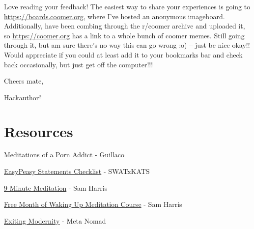 \documentclass[
]{book}
\begin{document}
Love reading your feedback! The easiest way to share your experiences is going to \url{https://boards.coomer.org}, where I've hosted an anonymous imageboard. Additionally, have been combing through the r/coomer archive and uploaded it, so \url{https://coomer.org} has a link to a whole bunch of coomer memes. Still going through it, but am sure there's no way this can go wrong :o) -- just be nice okay!! Would appreciate if you could at least add it to your bookmarks bar and check back occasionally, but just get off the computer!!!

Cheers mate,

Hackauthor²

\hypertarget{resources}{%
\chapter*{Resources}\label{resources}}

\href{https://mega.nz/file/DlxiFACJ\#FLglnhxnenKVIDn9JVQHI1v_ZGs1yzC3Kvc0mLf13ds}{Meditations of a Porn Addict} - Guillaco

\href{https://pastebin.com/dybv6qkD}{EasyPeasy Statements Checklist} - SWATxKATS

\href{https://www.youtube.com/watch?v=tw7XBKhZJh4}{9 Minute Meditation} - Sam Harris

\href{https://share.wakingup.com/a13290}{Free Month of Waking Up Meditation Course} - Sam Harris

\href{https://meta-nomad.net/exiting-modernity}{Exiting Modernity} - Meta Nomad

  
\end{document}
